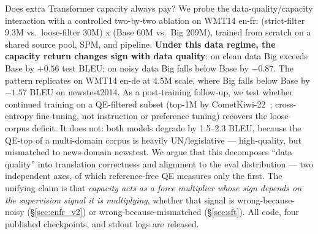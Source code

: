 Does extra Transformer capacity always pay? We probe the data-quality/capacity interaction with a controlled two-by-two ablation on WMT14 en-fr: (strict-filter 9.3M vs.\ loose-filter 30M) x (Base 60M vs.\ Big 209M), trained from scratch on a shared source pool, SPM, and pipeline. \textbf{Under this data regime, the capacity return changes sign with data quality}: on clean data Big exceeds Base by $+0.56$ test BLEU; on noisy data Big falls below Base by $-0.87$. The pattern replicates on WMT14 en-de at 4.5M scale, where Big falls below Base by $-1.57$ BLEU on newstest2014. As a post-training follow-up, we test whether continued training on a QE-filtered subset (top-1M by CometKiwi-22~\cite{rei2022cometkiwi}; cross-entropy fine-tuning, not instruction or preference tuning) recovers the loose-corpus deficit. It does not: both models degrade by 1.5--2.3 BLEU, because the QE-top of a multi-domain corpus is heavily UN/legislative --- high-quality, but mismatched to news-domain newstest. We argue that this decomposes ``data quality'' into translation correctness and alignment to the eval distribution --- two independent axes, of which reference-free QE measures only the first. The unifying claim is that \emph{capacity acts as a force multiplier whose sign depends on the supervision signal it is multiplying}, whether that signal is wrong-because-noisy (\S\ref{sec:enfr_v2}) or wrong-because-mismatched (\S\ref{sec:sft}). All code, four published checkpoints, and stdout logs are released.

